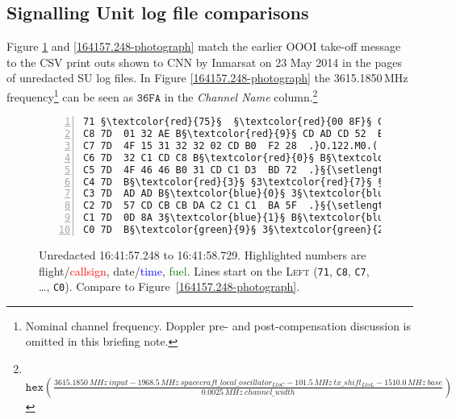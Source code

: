\documentclass[tikz,a4paper,12pt]{article}
\begin{document}
{\subsection{Signalling Unit log file comparisons}

Figure \ref{164157.248-hex} and \ref{164157.248-photograph} match the earlier
\gls{OOOI} take-off message to the \gls{CSV} print outs shown to CNN by
Inmarsat on 23 May 2014 in the pages of unredacted \gls{SU} log
files.  In Figure \ref{164157.248-photograph} the 3615.1850\,MHz
frequency\footnote{Nominal channel frequency. Doppler pre- and post-compensation discussion is omitted in this briefing note.}
 can be seen as $\mathtt{36FA}$ in the \emph{Channel Name} column.\footnote{
\,$\mathtt{hex}(\frac{{3615.1850\,{MHz}\ input}-{1968.5\,MHz\ spacecraft\_local\_oscillator_{LtoC}}-{101.5\,MHz\ tx\_shift_{LtoL}}-{1510.0\,MHz\ base}}{0.0025\,MHz {\ channel\_width}})$}

\begin{figure}[ht!]%
\setlength{\abovecaptionskip}{0.5em plus 0.5em minus 0.5em}%
\label{164157.248-hex}%
\begin{lstlisting}[language=SATCOM,numbers=left]
71 §\textcolor{red}{75}§  §\textcolor{red}{00 8F}§ C5 7D 09 60 FF FF  19 15  qu...}.`....
C8 7D  01 32 AE B§\textcolor{red}{9}§ CD AD CD 52  B5 87  .}.2.§\textcolor{red}{9}§M-MR..
C7 7D  4F 15 31 32 32 02 CD B0  F2 28  .}O.122.M0.(
C6 7D  32 C1 CD C8 B§\textcolor{red}{0}§ B§\textcolor{red}{3}§ 3§\textcolor{red}{7}§ B§\textcolor{red}{0}§  72 CA  .}2AMH§\textcolor{red}{0370}§r.
C5 7D  4F 46 46 B0 31 CD C1 D3  BD 72  .}§{\setlength{\fboxsep}{0.15em}\colorbox{lightskyblue}{OFF01MAS}}§.r
C4 7D  B§\textcolor{red}{3}§ §3\textcolor{red}{7}§ §B\textcolor{red}{0}§ 20 20 20 20 2F  D0 AA  .}§{\setlength{\fboxsep}{0.15em}\colorbox{lightskyblue}{\textcolor{red}{370}{ }{ }{ }{ }/}}§..
C3 7D  AD AD B§\textcolor{blue}{0}§ 3§\textcolor{blue}{7}§ 3§\textcolor{blue}{1}§ B§\textcolor{blue}{6}§ 3§\textcolor{blue}{4}§ 3§\textcolor{blue}{1}§  FB D0  .}§{\setlength{\fboxsep}{0.15em}\colorbox{lightskyblue}{{-}{-}\textcolor{blue}{071641}}}§..
C2 7D  57 CD CB CB DA C2 C1 C1  BA 5F  .}§{\setlength{\fboxsep}{0.15em}\colorbox{lightskyblue}{WMKKZBAA}}§._
C1 7D  0D 8A 3§\textcolor{blue}{1}§ B§\textcolor{blue}{6}§ 3§\textcolor{blue}{4}§ 3§\textcolor{blue}{1}§ 20 3§\textcolor{green}{4}§  46 9A  .}§{\setlength{\fboxsep}{0.15em}\colorbox{lightskyblue}{..\textcolor{blue}{1641} \textcolor{green}{4}}}§F.
C0 7D  B§\textcolor{green}{9}§ 3§\textcolor{green}{2}§ 83 B8 7E 7F 00 00  12 2B  .}§{\setlength{\fboxsep}{0.15em}\colorbox{lightskyblue}{\textcolor{green}{92}}}§.8.....+
\end{lstlisting}
\caption[Unredacted SUs 16:41:57{\small.248}--16:41:58{\small.729} (OOOI SU user data)---7 March 2014]{Unredacted  16:41:57{\small.248} to 16:41:58{\small.729}. Highlighted numbers are flight/\textcolor{red}{callsign}, date/\textcolor{blue}{time}, \textcolor{green}{fuel}. Lines start on the \textsc{Left} (\texttt{71}, \texttt{C8}, \texttt{C7}, \ldots, \texttt{C0}).  Compare to Figure~\ref{164157.248-photograph}.}%
\end{figure}

}
\end{document}
